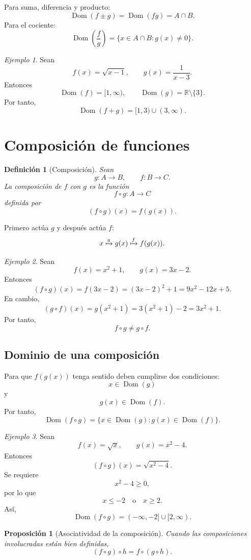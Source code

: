 \documentclass[12pt]{article}
\newtheorem{definicion}{Definición}[section]
\newtheorem{proposicion}{Proposición}[section]
\theoremstyle{remark}
\newtheorem{ejemplo}{Ejemplo}[section]
\newcommand{\R}{\mathbb{R}}
\newcommand{\Dom}{\operatorname{Dom}}
\begin{document}
Para suma, diferencia y producto:
\[
\Dom(f\pm g)=\Dom(fg)=A\cap B.
\]
Para el cociente:
\[
\Dom\left(\frac fg\right)
=\{x\in A\cap B:g(x)\neq0\}.
\]

\begin{ejemplo}
Sean
\[
f(x)=\sqrt{x-1},
\qquad
g(x)=\frac{1}{x-3}.
\]
Entonces
\[
\Dom(f)=[1,\infty),
\qquad
\Dom(g)=\R\setminus\{3\}.
\]
Por tanto,
\[
\Dom(f+g)=[1,3)\cup(3,\infty).
\]
\end{ejemplo}

\section{Composición de funciones}

\begin{definicion}[Composición]
Sean
\[
g:A\to B,\qquad f:B\to C.
\]
La composición de $f$ con $g$ es la función
\[
f\circ g:A\to C
\]
definida por
\[
(f\circ g)(x)=f(g(x)).
\]
\end{definicion}

Primero actúa $g$ y después actúa $f$:
\[
x\xmapsto{g}g(x)\xmapsto{f}f(g(x)).
\]

\begin{ejemplo}
Sean
\[
f(x)=x^2+1,\qquad g(x)=3x-2.
\]
Entonces
\[
(f\circ g)(x)
=f(3x-2)
=(3x-2)^2+1
=9x^2-12x+5.
\]
En cambio,
\[
(g\circ f)(x)
=g(x^2+1)
=3(x^2+1)-2
=3x^2+1.
\]
Por tanto,
\[
f\circ g\neq g\circ f.
\]
\end{ejemplo}

\subsection{Dominio de una composición}

Para que $f(g(x))$ tenga sentido deben cumplirse dos condiciones:
\[
x\in\Dom(g)
\]
y
\[
g(x)\in\Dom(f).
\]
Por tanto,
\[
\Dom(f\circ g)
=
\{x\in\Dom(g):g(x)\in\Dom(f)\}.
\]

\begin{ejemplo}
Sean
\[
f(x)=\sqrt{x},\qquad g(x)=x^2-4.
\]
Entonces
\[
(f\circ g)(x)=\sqrt{x^2-4}.
\]
Se requiere
\[
x^2-4\geq0,
\]
por lo que
\[
x\leq-2\quad\text{o}\quad x\geq2.
\]
Así,
\[
\Dom(f\circ g)=(-\infty,-2]\cup[2,\infty).
\]
\end{ejemplo}

\begin{proposicion}[Asociatividad de la composición]
Cuando las composiciones involucradas están bien definidas,
\[
(f\circ g)\circ h=f\circ(g\circ h).
\]
\end{proposicion}
\end{document}
